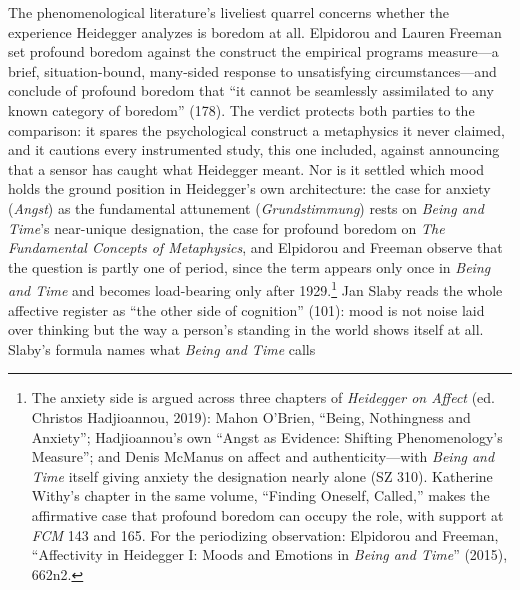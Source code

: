 The phenomenological literature's liveliest quarrel concerns whether the experience Heidegger
analyzes is boredom at all. Elpidorou and Lauren Freeman set profound boredom against the
construct the empirical programs measure---a brief, situation-bound, many-sided response to
unsatisfying circumstances---and conclude of profound boredom that ``it cannot be seamlessly assimilated to any known category of boredom'' (178). The
verdict protects both parties to the comparison: it spares the psychological construct a
metaphysics it never claimed, and it cautions every instrumented study, this one included,
against announcing that a sensor has caught what Heidegger meant. Nor is it settled which
mood holds the ground position in Heidegger's own architecture: the case for anxiety
(\textit{Angst}) as the fundamental attunement (\textit{Grundstimmung}) rests on
\textit{Being and Time}'s near-unique designation, the case for profound boredom on
\textit{The Fundamental Concepts of Metaphysics}, and Elpidorou and Freeman observe that the
question is partly one of period, since the term appears only once in \textit{Being and Time}
and becomes load-bearing only after 1929.\footnote{The anxiety side is argued across three
chapters of \textit{Heidegger on Affect} (ed. Christos Hadjioannou, 2019): Mahon O'Brien,
``Being, Nothingness and Anxiety''; Hadjioannou's own ``Angst as Evidence: Shifting
Phenomenology's Measure''; and Denis McManus on affect and authenticity---with \textit{Being and Time}
itself giving anxiety the designation nearly alone (SZ 310). Katherine Withy's chapter in the
same volume, ``Finding Oneself, Called,'' makes the affirmative case that profound boredom
can occupy the role, with support at \textit{FCM} 143 and 165. For the periodizing
observation: Elpidorou and Freeman, ``Affectivity in Heidegger I: Moods and Emotions in
\textit{Being and Time}'' (2015), 662n2.} Jan Slaby reads the whole affective register as
``the other side of cognition'' (101): mood is not noise laid over thinking but the way a person's standing in the
world shows itself at all. Slaby's formula names what \textit{Being and Time} calls
